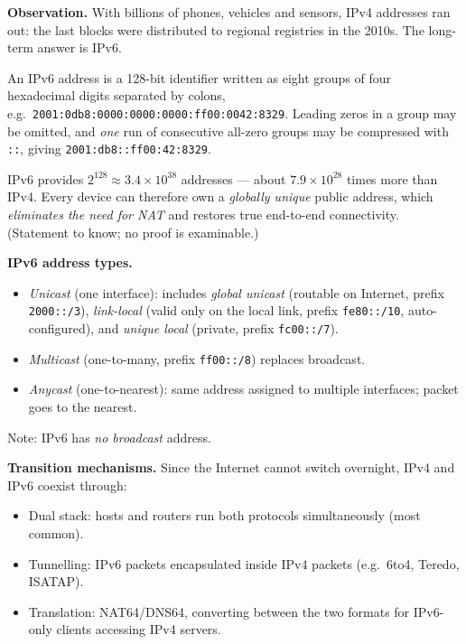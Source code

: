 \documentclass[11pt]{article}
\newcommand{\cle}[1]{{\popxbold\color{popdark}#1}}
\newcounter{popsec}
\newcounter{popsub}
\newcommand{\courssub}[1]{%
  \stepcounter{popsub}%
  \par\vspace{9pt}\noindent{\popxbold\fontsize{11.5}{13}\selectfont\color{popink}{\color{poporange}\thepopsec.\thepopsub}\hspace{6pt}#1}\par\nopagebreak\vspace{4pt}
}
\begin{document}
\courssub{IPv6: The New Generation}

\textbf{Observation.} With billions of phones, vehicles and sensors, IPv4 addresses ran out: the last blocks were distributed to regional registries in the 2010s. The long-term answer is \cle{IPv6}.

\begin{definition}
An \cle{IPv6 address} is a 128-bit identifier written as eight groups of four hexadecimal digits separated by colons, e.g.\ \texttt{2001:0db8:0000:0000:0000:ff00:0042:8329}. Leading zeros in a group may be omitted, and \emph{one} run of consecutive all-zero groups may be compressed with \texttt{::}, giving \texttt{2001:db8::ff00:42:8329}.
\end{definition}

\begin{propriete}
IPv6 provides $2^{128} \approx 3.4 \times 10^{38}$ addresses --- about $7.9 \times 10^{28}$ times more than IPv4. Every device can therefore own a \emph{globally unique} public address, which \emph{eliminates the need for NAT} and restores true end-to-end connectivity. (Statement to know; no proof is examinable.)
\end{propriete}

\textbf{IPv6 address types.}
\begin{itemize}
\item \emph{Unicast} (one interface): includes \emph{global unicast} (routable on Internet, prefix \texttt{2000::/3}), \emph{link-local} (valid only on the local link, prefix \texttt{fe80::/10}, auto-configured), and \emph{unique local} (private, prefix \texttt{fc00::/7}).
\item \emph{Multicast} (one-to-many, prefix \texttt{ff00::/8}) replaces broadcast.
\item \emph{Anycast} (one-to-nearest): same address assigned to multiple interfaces; packet goes to the nearest.
\end{itemize}
Note: IPv6 has \emph{no broadcast} address.

\textbf{Transition mechanisms.} Since the Internet cannot switch overnight, IPv4 and IPv6 coexist through:
\begin{itemize}
\item \cle{Dual stack}: hosts and routers run both protocols simultaneously (most common).
\item \cle{Tunnelling}: IPv6 packets encapsulated inside IPv4 packets (e.g.\ 6to4, Teredo, ISATAP).
\item \cle{Translation}: NAT64/DNS64, converting between the two formats for IPv6-only clients accessing IPv4 servers.
\end{itemize}
\end{document}
